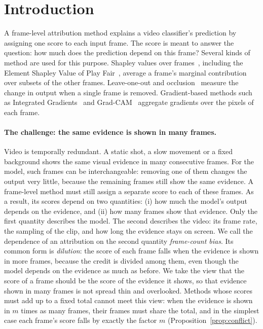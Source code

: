 \section{Introduction}
\label{sec:intro}


A frame-level attribution method explains a video classifier's prediction by assigning one score to each input frame.
The score is meant to answer the question: how much does the prediction depend on this frame?
Several kinds of method are used for this purpose.
Shapley values over frames~\citep{lloyd_s__shapley_005c222c, strumbeljerik_42cc2316}, including the Element Shapley Value of Play Fair~\citep{will_price_ec92d5a0}, average a frame's marginal contribution over subsets of the other frames.
Leave-one-out and occlusion~\citep{matthew_d__zeiler_d7ae7e07} measure the change in output when a single frame is removed.
Gradient-based methods such as Integrated Gradients~\citep{mukund_sundararajan_62086538} and Grad-CAM~\citep{ramprasaath_r__selvaraju_bb3d7670} aggregate gradients over the pixels of each frame.

\paragraph{The challenge: the same evidence is shown in many frames.}
Video is temporally redundant.
A static shot, a slow movement or a fixed background shows the same visual evidence in many consecutive frames.
For the model, such frames can be interchangeable: removing one of them changes the output very little, because the remaining frames still show the same evidence.
A frame-level method must still assign a separate score to each of these frames.
As a result, its scores depend on two quantities:
(i) how much the model's output depends on the evidence, and
(ii) how many frames show that evidence.
Only the first quantity describes the model.
The second describes the video: its frame rate, the sampling of the clip, and how long the evidence stays on screen.
We call the dependence of an attribution on the second quantity \emph{frame-count bias}.
Its common form is \emph{dilution}: the score of each frame falls when the evidence is shown in more frames, because the credit is divided among them, even though the model depends on the evidence as much as before.
We take the view that the score of a frame should be the score of the evidence it shows, so that evidence shown in many frames is not spread thin and overlooked.
Methods whose scores must add up to a fixed total cannot meet this view: when the evidence is shown in $m$ times as many frames, their frames must share the total, and in the simplest case each frame's score falls by exactly the factor $m$ (Proposition~\ref{prop:conflict}).

